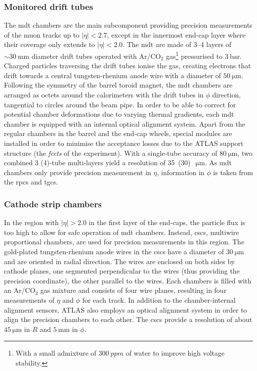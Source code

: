 \subsubsection{Monitored drift tubes}

The \gls{mdt} chambers are the main subcomponent providing precision measurements of the muon tracks up to $\vert\eta\vert <2.7$, except in the innermost end-cap layer where their coverage only extends to $\vert\eta\vert <2.0$. The \gls{mdt} are made of 3--4 layers of $\sim \SI{30}{\milli\meter}$ diameter drift tubes operated with Ar/CO$_2$ gas\footnote{With a small admixture of $\SI{300}{ppm}$ of water to improve high voltage stability.} pressurised to $\SI{3}{\bar}$. Charged particles traversing the drift tubes ionise the gas, creating electrons that drift towards a central tungsten-rhenium anode wire with a diameter of $\SI{50}{\micro\meter}$. Following the symmetry of the barrel toroid magnet, the \gls{mdt} chambers are arranged as octets around the calorimeters with the drift tubes in $\phi$ direction, \ie tangential to circles around the beam pipe. In order to be able to correct for potential chamber deformations due to varying thermal gradients, each \gls{mdt} chamber is equipped with an internal optical alignment system. Apart from the regular chambers in the barrel and the end-cap wheels, special modules are installed in order to minimise the acceptance losses due to the ATLAS support structure (the \textit{feets} of the experiment). With a single-tube accuracy of $\SI{80}{\micro\meter}$, two combined 3 (4)-tube multi-layers yield a resolution of 35~(30)~$\SI{}{\micro\meter}$. As \gls{mdt} chambers only provide precision measurement in $\eta$, information in $\phi$ is taken from the \glspl{rpc} and \glspl{tgc}.

\subsubsection{Cathode strip chambers}

In the region with $\vert\eta\vert > 2.0$ in the first layer of the end-caps, the particle flux is too high to allow for safe operation of \gls{mdt} chambers. Instead, \glspl{csc}, multiwire proportional chambers, are used for precision measurements in this region. The gold-plated tungsten-rhenium anode wires in the \glspl{csc} have a diameter of $\SI{30}{\micro\meter}$ and are oriented in radial direction. The wires are enclosed on both sides by cathode planes, one segmented perpendicular to the wires (thus providing the precision coordinate), the other parallel to the wires. Each chambers is filled with an Ar/CO$_2$ gas mixture and consists of four wire planes, resulting in four measurements of $\eta$ and $\phi$ for each track. In addition to the chamber-internal alignment sensors, ATLAS also employs an optical alignment system in order to align the precision chambers to each other. The \glspl{csc} provide a resolution of about $\SI{45}{\micro\meter}$ in $R$ and $\SI{5}{\milli\meter}$ in $\phi$.

